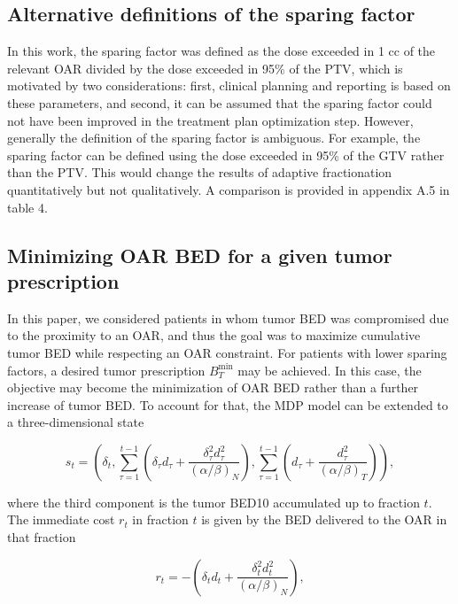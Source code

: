 \documentclass[11pt]{article}
\begin{document}
\subsection{Alternative definitions of the sparing factor}

In this work, the sparing factor was defined as the dose exceeded in 1 cc of the relevant OAR divided by the dose exceeded in 95\% of the PTV, which is motivated by two considerations: first, clinical planning and reporting is based on these parameters, and second, it can be assumed that the sparing factor could not have been improved in the treatment plan optimization step. However, generally the definition of the sparing factor is ambiguous. For example, the sparing factor can be defined using the dose exceeded in 95\% of the GTV rather than the PTV. This would change the results of adaptive fractionation quantitatively but not qualitatively. A comparison is provided in appendix A.5 in table 4.

\subsection{Minimizing OAR BED for a given tumor prescription}

In this paper, we considered patients in whom tumor BED was compromised due to the proximity to an OAR, and thus the goal was to maximize cumulative tumor BED while respecting an OAR constraint. For patients with lower sparing factors, a desired tumor prescription $B_T^{\min}$ may be achieved. In this case, the objective may become the minimization of OAR BED rather than a further increase of tumor BED. To account for that, the MDP model can be extended to a three-dimensional state

\begin{equation}
s_t = \left(
\delta_t,
\sum_{\tau=1}^{t-1}\left(\delta_{\tau} d_{\tau} + \frac{\delta_{\tau}^2 d_{\tau}^2}{(\alpha/\beta)_N}\right),
\sum_{\tau=1}^{t-1}\left(d_{\tau} + \frac{d_{\tau}^2}{(\alpha/\beta)_T}\right)
\right),
\label{eq:state-three-dim}
\end{equation}

where the third component is the tumor BED10 accumulated up to fraction $t$. The immediate cost $r_t$ in fraction $t$ is given by the BED delivered to the OAR in that fraction

\begin{equation}
r_t = -\left(\delta_t d_t + \frac{\delta_t^2 d_t^2}{(\alpha/\beta)_N}\right),
\label{eq:oar-cost}
\end{equation}
\end{document}
